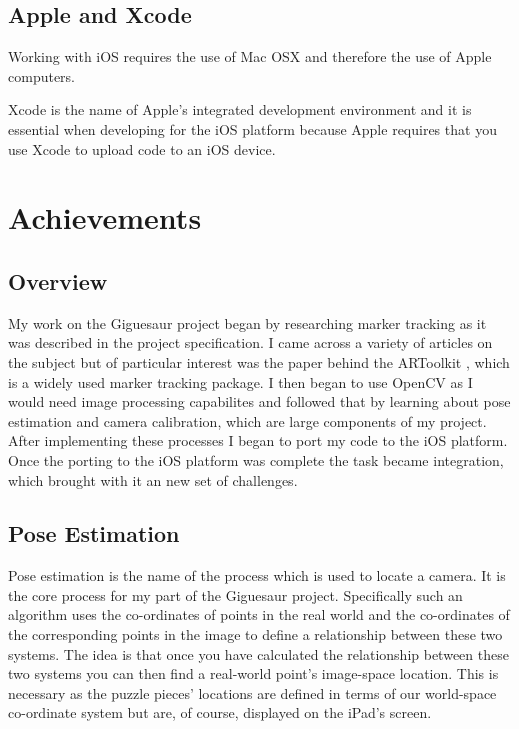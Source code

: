 \documentclass{article}
\begin{document}
\subsection{Apple and Xcode}

Working with iOS requires the use of Mac OSX and therefore the use of Apple computers. 

Xcode is the name of Apple's integrated development environment and it is essential when developing for the iOS platform because Apple requires that you use Xcode to upload code to an iOS device.

\section{Achievements}

\subsection{Overview}

My work on the Giguesaur project began by researching marker tracking as it was described in the project specification. I came across a variety of articles on the subject but of particular interest was the paper behind the ARToolkit \cite{artoolkit}, which is a widely used marker tracking package. I then began to use OpenCV as I would need image processing capabilites and followed that by learning about pose estimation and camera calibration, which are large components of my project. After implementing these processes I began to port my code to the iOS platform. Once the porting to the iOS platform was complete the task became integration, which brought with it an new set of challenges. 

\subsection{Pose Estimation}

Pose estimation is the name of the process which is used to locate a camera. It is the core process for my part of the Giguesaur project. Specifically such an algorithm uses the co-ordinates of points in the real world and the co-ordinates of the corresponding points in the image to define a relationship between these two systems. The idea is that once you have calculated the relationship between these two systems you can then find a real-world point's image-space location. This is necessary as the puzzle pieces' locations are defined in terms of our world-space co-ordinate system but are, of course, displayed on the iPad's screen. 
\end{document}
